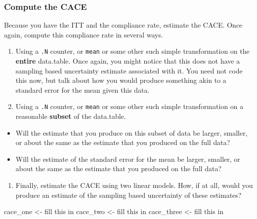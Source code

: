 \documentclass[
]{article}
\newenvironment{Shaded}{\begin{snugshade}}{\end{snugshade}}
\newcommand{\NormalTok}[1]{#1}
\newcommand{\OtherTok}[1]{\textcolor[rgb]{0.56,0.35,0.01}{#1}}
\newcommand{\StringTok}[1]{\textcolor[rgb]{0.31,0.60,0.02}{#1}}
\providecommand{\tightlist}{%
  \setlength{\itemsep}{0pt}\setlength{\parskip}{0pt}}
\theoremstyle{definition}
\theoremstyle{definition}
\theoremstyle{definition}
\theoremstyle{definition}
\theoremstyle{remark}
\begin{document}
\subsubsection{Compute the CACE}\label{compute-the-cace}

Because you have the ITT and the compliance rate, estimate the CACE. Once again, compute this compliance rate in several ways.

\begin{enumerate}
\def\labelenumi{\arabic{enumi}.}
\tightlist
\item
  Using a \texttt{.N} counter, or \texttt{mean} or some other such simple transformation on the \textbf{entire} data.table. Once again, you might notice that this does not have a sampling based uncertainty estimate associated with it. You need not code this now, but talk about how you would produce something akin to a standard error for the mean given this data.
\item
  Using a \texttt{.N} counter, or \texttt{mean} or some other such simple transformation on a reasonable \textbf{subset} of the data.table.
\end{enumerate}

\begin{itemize}
\tightlist
\item
  Will the estimate that you produce on this subset of data be larger, smaller, or about the same as the estimate that you produced on the full data?
\item
  Will the estimate of the standard error for the mean be larger, smaller, or about the same as the estimate that you produced on the full data?
\end{itemize}

\begin{enumerate}
\def\labelenumi{\arabic{enumi}.}
\setcounter{enumi}{2}
\tightlist
\item
  Finally, estimate the CACE using two linear models. How, if at all, would you produce an estimate of the sampling based uncertainty of these estimates?
\end{enumerate}

\begin{Shaded}
\begin{Highlighting}[]
\NormalTok{cace\_one   }\OtherTok{\textless{}{-}} \StringTok{\textquotesingle{}fill this in\textquotesingle{}} 
\NormalTok{cace\_two   }\OtherTok{\textless{}{-}} \StringTok{\textquotesingle{}fill this in\textquotesingle{}} 
\NormalTok{cace\_three }\OtherTok{\textless{}{-}} \StringTok{\textquotesingle{}fill this in\textquotesingle{}} 
\end{Highlighting}
\end{Shaded}
\end{document}
